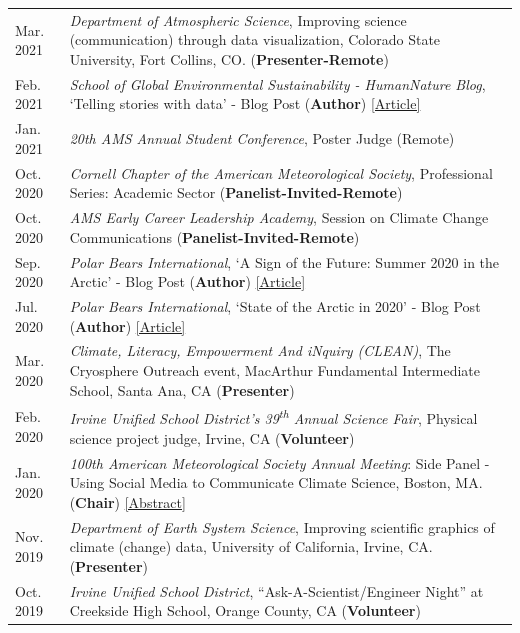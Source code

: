 \documentclass[margin,line,palatino,courier,10pt]{res}
\begin{document}
\begin{resume}
\begin{tabular}{@{}p{0.9in}p{4in}}
Mar. 2021 & \textit{Department of Atmospheric Science}, Improving science (communication) through data visualization, Colorado State University, Fort Collins, CO. (\textbf{Presenter-Remote})\\
Feb. 2021 & \textit{School of Global Environmental Sustainability - HumanNature Blog}, `Telling stories with data' - Blog Post (\textbf{Author}) \href{https://sustainability.colostate.edu/blog/humannature/zachary-labe/}{[Article]}\\
Jan. 2021 & \textit{20th AMS Annual Student Conference}, Poster Judge (Remote)\\
Oct. 2020 & \textit{Cornell Chapter of the American Meteorological Society}, Professional Series: Academic Sector (\textbf{Panelist-Invited-Remote})\\
Oct. 2020 & \textit{AMS Early Career Leadership Academy}, Session on Climate Change Communications (\textbf{Panelist-Invited-Remote})\\
Sep. 2020 & \textit{Polar Bears International}, `A Sign of the Future: Summer 2020 in the Arctic' - Blog Post (\textbf{Author}) \href{https://polarbearsinternational.org/news/article-climate-change/a-sign-of-the-future-summer-2020-in-the-arctic/}{[Article]}\\
Jul. 2020 & \textit{Polar Bears International}, `State of the Arctic in 2020' - Blog Post (\textbf{Author}) \href{https://polarbearsinternational.org/news/article-climate-change/state-of-the-arctic-in-2020/}{[Article]}\\
Mar. 2020 &\textit{Climate, Literacy, Empowerment And iNquiry (CLEAN)}, The Cryosphere Outreach event, MacArthur Fundamental Intermediate School, Santa Ana, CA (\textbf{Presenter})\\
Feb. 2020 & \textit{Irvine Unified School District's 39\textsuperscript{th} Annual Science Fair}, Physical science project judge, Irvine, CA (\textbf{Volunteer})\\
Jan. 2020 & \textit{100th American Meteorological Society Annual Meeting}: Side Panel - Using Social Media to Communicate Climate Science, Boston, MA. (\textbf{Chair}) \href{https://ams.confex.com/ams/2020Annual/meetingapp.cgi/Session/53195}{[Abstract]}\\
Nov. 2019 & \textit{Department of Earth System Science}, Improving scientific graphics of climate (change) data, University of California, Irvine, CA. (\textbf{Presenter})\\
Oct. 2019 & \textit{Irvine Unified School District}, ``Ask-A-Scientist/Engineer Night'' at Creekside High School, Orange County, CA (\textbf{Volunteer})\\

\end{tabular}
\end{resume}
\end{document}

